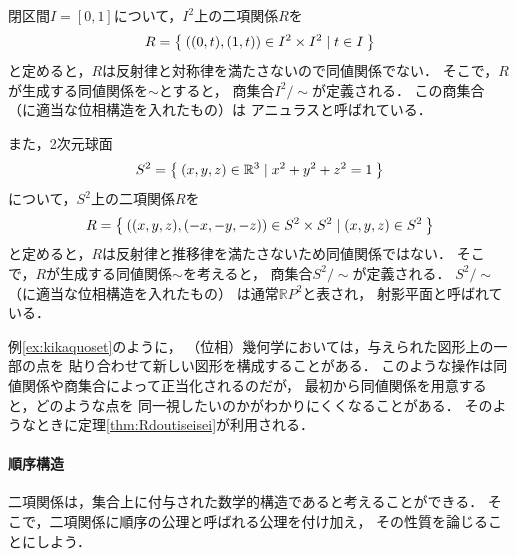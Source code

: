    \begin{ex} \label{ex:kikaquoset}
     閉区間$I= [ 0,1]$について，$I^2$上の二項関係$R$を
     \begin{align*}
       R = \Set{ ((0,t),(1,t)) \in I^2 \times I^2 \mid t \in I }
     \end{align*}
     と定めると，$R$は反射律と対称律を満たさないので同値関係でない．
     そこで，$R$が生成する同値関係を$\sim$とすると，
     商集合$I^2/{\sim}$が定義される．
     この商集合（に適当な位相構造を入れたもの）は
     アニュラスと呼ばれている．
   
     また，2次元球面
     \begin{align*}
       S^2 = \Set{ (x,y,z) \in \mathbb{R}^3 \mid x^2 + y^2 + z^2 =1}
     \end{align*}
     について，$S^2$上の二項関係$R$を
     \begin{align*}
       R = \Set{ ((x,y,z) , (-x,-y,-z)) \in S^2 \times S^2 
       \mid (x ,y,z ) \in S^2}
     \end{align*}
     と定めると，$R$は反射律と推移律を満たさないため同値関係ではない．
     そこで，$R$が生成する同値関係$\sim$を考えると，
     商集合$S^2/{\sim}$が定義される．
     $S^2/{\sim}$（に適当な位相構造を入れたもの）
     は通常$\mathbb{R} P^2$と表され，
     射影平面と呼ばれている．
   \end{ex}

   例\ref{ex:kikaquoset}のように，
   （位相）幾何学においては，与えられた図形上の一部の点を
   貼り合わせて新しい図形を構成することがある．
   このような操作は同値関係や商集合によって正当化されるのだが，
   最初から同値関係を用意すると，どのような点を
   同一視したいのかがわかりにくくなることがある．
   そのようなときに定理\ref{thm:Rdoutiseisei}が利用される．



   




  \paragraph{順序構造}
   二項関係は，集合上に付与された数学的構造であると考えることができる．
   そこで，二項関係に順序の公理と呼ばれる公理を付け加え，
   その性質を論じることにしよう．


